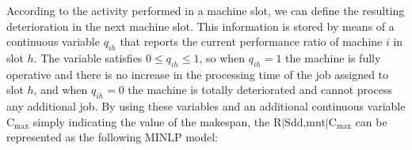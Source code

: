 \documentclass[a4paper,11pt]{article}
\begin{document}
According to the activity performed in a machine slot, we can define the resulting deterioration in the next machine slot. This information is stored by means of a continuous variable $q_{ih}$ that reports the current performance ratio of machine $i$ in slot $h$. The variable satisfies $0 \leq q_{ih} \leq 1$, so when $q_{ih}=1$ the machine is fully operative and there is no increase in the processing time of the job assigned to slot $h$, and when $q_{ih}=0$ the machine is totally deteriorated and cannot process any additional job. By using these variables and an additional continuous variable C$_{\max}$ simply indicating the value of the makespan, the  R$|$Sdd,mnt$|$C$_{\max}$ can be represented as the following MINLP model: 
\end{document}
